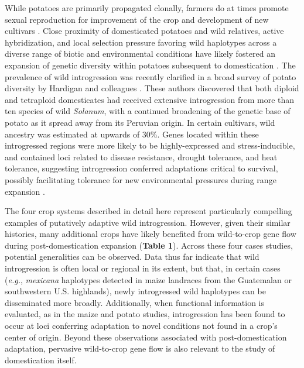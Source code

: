 \documentclass[11pt]{article}
\begin{document}
\begin{enumerate}
While potatoes are primarily propagated clonally, farmers do at times promote sexual reproduction for improvement of the crop and development of new cultivars \cite{quiros1992increase}.
Close proximity of domesticated potatoes and wild relatives, active hybridization, and local selection pressure favoring wild haplotypes across a diverse range of biotic and environmental conditions have likely fostered an expansion of genetic diversity within potatoes subsequent to domestication \cite{brush1995potato}.
The prevalence of wild introgression was recently clarified in a broad survey of potato diversity by Hardigan and colleagues \cite{hardigan2017genome}.
These authors discovered that both diploid and tetraploid domesticates had received extensive introgression from more than ten species of wild \emph{Solanum}, with a continued broadening of the genetic base of potato as it spread away from its Peruvian origin.
In certain cultivars, wild ancestry was estimated at upwards of 30\%.
Genes located within these introgressed regions were more likely to be highly-expressed and stress-inducible, and contained loci related to disease resistance, drought tolerance, and heat tolerance, suggesting introgression conferred adaptations critical to survival, possibly facilitating tolerance for new environmental pressures during range expansion \cite{hardigan2017genome}.
\end{enumerate}


The four crop systems described in detail here represent particularly compelling examples of putatively adaptive wild introgression.
However, given their similar histories, many additional crops have likely benefited from wild-to-crop gene flow during post-domestication expansion (\textbf{Table 1}).
Across these four cases studies, potential generalities can be observed.
Data thus far indicate that wild introgression is often local or regional in its extent, but that, in certain cases (\emph{e.g.}, \emph{mexicana} haplotypes detected in maize landraces from the Guatemalan or southwestern U.S. highlands), newly introgressed wild haplotypes can be disseminated more broadly.
Additionally, when functional information is evaluated, as in the maize and potato studies, introgression has been found to occur at loci conferring adaptation to novel conditions not found in a crop's center of origin.
Beyond these observations associated with post-domestication adaptation, pervasive wild-to-crop gene flow is also relevant to the study of domestication itself.
\end{document}
